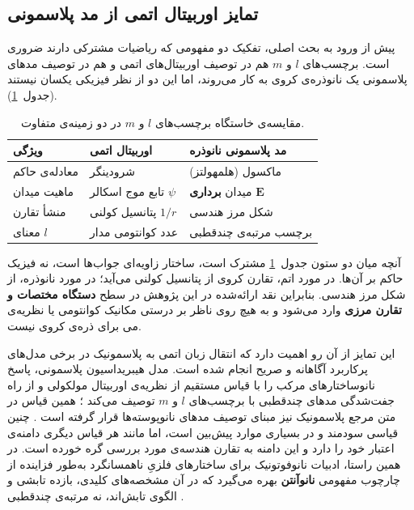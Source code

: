 \subsection{تمایز اوربیتال اتمی از مد پلاسمونی}
\label{sec:theory-distinction}

پیش از ورود به بحث اصلی، تفکیک دو مفهومی که ریاضیات مشترکی دارند ضروری
است. برچسب‌های $l$ و $m$ هم در توصیف اوربیتال‌های اتمی و هم در توصیف مدهای
پلاسمونی یک نانوذره‌ی کروی به کار می‌روند، اما این دو از نظر فیزیکی یکسان
نیستند (جدول~\ref{tab:labels}).

\begin{table}[htbp]
  \centering
  \caption{مقایسه‌ی خاستگاه برچسب‌های $l$ و $m$ در دو زمینه‌ی متفاوت.}
  \label{tab:labels}
  \begin{tabular}{lll}
    \toprule
    ویژگی & اوربیتال اتمی & مد پلاسمونی نانوذره \\
    \midrule
    معادله‌ی حاکم & شرودینگر & ماکسول (هلمهولتز) \\
    ماهیت میدان  & تابع موج اسکالر $\psi$ & میدان \textbf{برداری} $\mathbf{E}$ \\
    منشأ تقارن   & پتانسیل کولنی $1/r$ & شکل مرز هندسی \\
    معنای $l$    & عدد کوانتومی مدار & برچسب مرتبه‌ی چندقطبی \\
    \bottomrule
  \end{tabular}
\end{table}

آنچه میان دو ستون جدول~\ref{tab:labels} مشترک است، ساختار زاویه‌ای
جواب‌ها است، نه فیزیک حاکم بر آن‌ها. در مورد اتم، تقارن کروی از پتانسیل
کولنی می‌آید؛ در مورد نانوذره، از شکل مرز هندسی. بنابراین نقد ارائه‌شده در
این پژوهش در سطح \textbf{دستگاه مختصات و تقارن مرزی} وارد می‌شود و به هیچ
روی ناظر بر درستی مکانیک کوانتومی یا نظریه‌ی می برای ذره‌ی کروی نیست.

این تمایز از آن رو اهمیت دارد که انتقال زبان اتمی به پلاسمونیک در برخی
مدل‌های پرکاربرد آگاهانه و صریح انجام شده است. مدل هیبریداسیون پلاسمونی،
پاسخ نانوساختارهای مرکب را با قیاس مستقیم از نظریه‌ی اوربیتال مولکولی و از
راه جفت‌شدگی مدهای چندقطبی با برچسب‌های $l$ و $m$ توصیف می‌کند
\cite{prodan2003hybridization}؛ همین قیاس در متن مرجع پلاسمونیک نیز
مبنای توصیف مدهای نانوپوسته‌ها قرار گرفته است
\cite[pp.~85--87]{maier2007plasmonics}. چنین قیاسی سودمند و در بسیاری موارد
پیش‌بین است، اما مانند هر قیاس دیگری دامنه‌ی اعتبار خود را دارد و این
دامنه به تقارن هندسه‌ی مورد بررسی گره خورده است. در همین راستا، ادبیات
نانوفوتونیک برای ساختارهای فلزیِ ناهمسانگرد به‌طور فزاینده از چارچوب
مفهومی \textbf{نانوآنتن} بهره می‌گیرد که در آن مشخصه‌های کلیدی، بازده
تابشی و الگوی تابش‌اند، نه مرتبه‌ی چندقطبی \cite{novotny2011antennas}.

